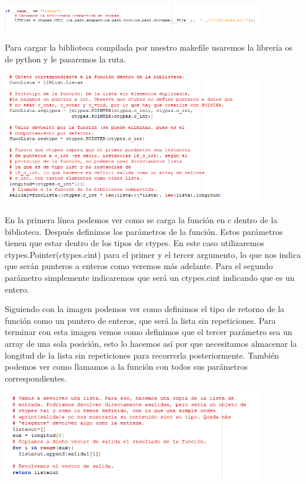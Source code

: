\documentclass{article}
\begin{document}
\includegraphics[width=11.5cm]{definicion.PNG}

Para cargar la biblioteca compilada por nuestro makefile usaremos la librería os de python y le pasaremos la ruta.

\includegraphics[width=11.5cm]{ctypes1.PNG}

En la primera línea podemos ver como se carga la función en c dentro de la biblioteca. Después definimos los parámetros de la función. Estos parámetros tienen que estar dentro de los tipos de ctypes. En este caso utilizaremos ctypes.Pointer(ctypes.cint) para el primer y el tercer argumento, lo que nos indica que serán punteros a enteros como veremos más adelante. Para el segundo parámetro simplemente indicaremos que será un ctypes.cint indicando que es un entero.

Siguiendo con la imagen podemos ver como definimos el tipo de retorno de la función como un puntero de enteros, que será la lista sin repeticiones. Para terminar con esta imagen vemos como definimos que el tercer parámetro sea un array de una sola posición, esto lo hacemos así por que necesitamos almacenar la longitud de la lista sin repeticiones para recorrerla posteriormente. También podemos ver como llamamos a la función con todos sus parámetros correspondientes.

\includegraphics[width=11.5cm]{ctypes2.PNG}
\end{document}
